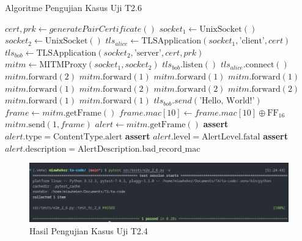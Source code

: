 \begin{algorithm}
  \caption{Algoritme Pengujian Kasus Uji T2.6}
  \label{alg:unit.test.t2.6}
  \begin{algorithmic}
    \State $cert, prk \gets generatePairCertificate()$
    \State $socket_1 \gets \text{UnixSocket}()$
    \State $socket_2 \gets \text{UnixSocket}()$
    \State $tls_{alice} \gets \text{TLSApplication}(socket_1, \text{'client'}, cert)$ 
    \State $tls_{bob} \gets \text{TLSApplication}(socket_2, \text{'server'}, cert, prk)$
    \State $mitm \gets \text{MITMProxy}(socket_1, socket_2)$
    \State
    \State $tls_{bob}.\text{listen}()$  
    \State $tls_{alice}.\text{connect}()$  
    \State
    \State $mitm.\text{forward}(2)$ 
    \State $mitm.\text{forward}(1)$ 
    \State $mitm.\text{forward}(1)$ 
    \State $mitm.\text{forward}(1)$ 
    \State $mitm.\text{forward}(1)$ 
    \State $mitm.\text{forward}(2)$ 
    \State $mitm.\text{forward}(2)$ 
    \State $mitm.\text{forward}(2)$ 
    \State $mitm.\text{forward}(1)$ 
    \State $mitm.\text{forward}(1)$ 
    \State
    \State $tls_{bob}.send(\text{'Hello, World!'})$
    \State $frame \gets mitm.\text{getFrame}()$
    \State $frame.mac[10] \gets frame.mac[10] \oplus \text{FF}_{16}$ 
    \State $mitm.\text{send}(1, frame)$
    \State
    \State $alert \gets mitm.\text{getFrame}()$
    \State \textbf{assert} $alert.\text{type} = \text{ContentType.alert}$
    \State \textbf{assert} $alert.\text{level} = \text{AlertLevel.fatal}$
    \State \textbf{assert} $alert.\text{description} = \text{AlertDescription.bad\_record\_mac}$
  \end{algorithmic}
\end{algorithm}

\begin{figure}[ht]
  \centering
  \includegraphics[width=\textwidth]{chapters/res/appendix-4/2.6.png}
  \caption{Hasil Pengujian Kasus Uji T2.4}
  \label{fig:unit.test.t2.6}
\end{figure}

